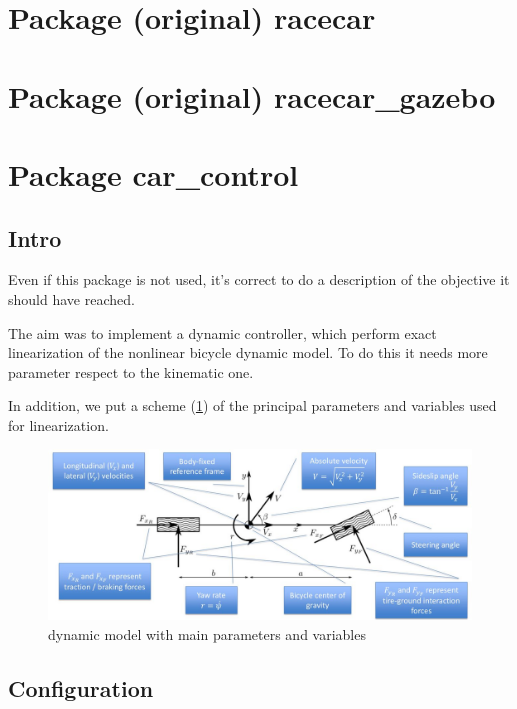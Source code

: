 \documentclass[12pt, letterpaper]{report}
\begin{document}
\section{Package (original) racecar}
\section{Package (original) racecar\_gazebo}

\section{Package car\_control}

\subsection{Intro}

Even if this package is not used, it's correct to do a description of the objective it should have reached.

The aim was to implement a dynamic controller, which perform exact linearization of the nonlinear bicycle dynamic model. To do this it needs more parameter respect to the kinematic one.

In addition, we put a scheme (\ref{fig:dynamic_model}) of the principal parameters and variables  used for linearization.

\begin{figure}[h]
	\includegraphics[scale=0.3]{dynamic_model}
	\caption{dynamic model with main parameters and variables}
	\label{fig:dynamic_model}
\end{figure}

\subsection{Configuration}
\end{document}
